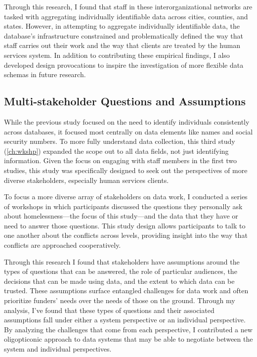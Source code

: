 Through this research, I found that staff in these interorganizational networks are tasked with aggregating individually identifiable data across cities, counties, and states. However, in attempting to aggregate individually identifiable data, the database's infrastructure constrained and problematically defined the way that staff carries out their work and the way that clients are treated by the human services system. In addition to contributing these empirical findings, I also developed design provocations to inspire the investigation of more flexible data schemas in future research.

\subsection{Multi-stakeholder Questions and Assumptions}
While the previous study focused on the need to identify individuals consistently across databases, it focused most centrally on data elements like names and social security numbers. To more fully understand data collection, this third study (\autoref{ch:wkshp}) expanded the scope out to all data fields, not just identifying information. Given the focus on engaging with staff members in the first two studies, this study was specifically designed to seek out the perspectives of more diverse stakeholders, especially human services clients. 

To focus a more diverse array of stakeholders on data work, I conducted a series of workshops in which participants discussed the questions they personally ask about homelessness---the focus of this study---and the data that they have or need to answer those questions. This study design allows participants to talk to one another about the conflicts across levels, providing insight into the way that conflicts are approached cooperatively.

Through this research I found that stakeholders have assumptions around the types of questions that can be answered, the role of particular audiences, the decisions that can be made using data, and the extent to which data can be trusted. These assumptions surface entangled challenges for data work and often prioritize funders' needs over the needs of those on the ground. Through my analysis, I've found that these types of questions and their associated assumptions fall under either a system perspective or an individual perspective. By analyzing the challenges that come from each perspective, I contributed a new oligopticonic approach to data systems that may be able to negotiate between the system and individual perspectives.

